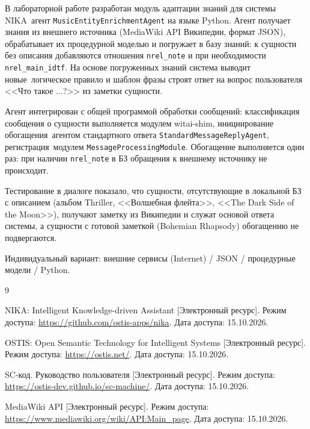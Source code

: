 
В лабораторной работе разработан модуль адаптации знаний для системы NIKA~\mdash  агент \texttt{MusicEntityEnrichmentAgent} на языке Python. Агент получает знания из внешнего источника (MediaWiki API Википедии, формат JSON), обрабатывает их процедурной моделью и погружает в базу знаний: к сущности без описания добавляются отношения \texttt{nrel\_note} и при необходимости \texttt{nrel\_main\_idtf}. На основе погруженных знаний система выводит новые~\mdash  логическое правило и шаблон фразы строят ответ на вопрос пользователя <<Что такое ...?>> из заметки сущности.

Агент интегрирован с общей программой обработки сообщений: классификация сообщения о сущности выполняется модулем witai-shim, инициирование обогащения~\mdash  агентом стандартного ответа \texttt{StandardMessageReplyAgent}, регистрация~\mdash  модулем \texttt{MessageProcessingModule}. Обогащение выполняется один раз: при наличии \texttt{nrel\_note} в БЗ обращения к внешнему источнику не происходит.

Тестирование в диалоге показало, что сущности, отсутствующие в локальной БЗ с описанием (альбом Thriller, <<Волшебная флейта>>, <<The Dark Side of the Moon>>), получают заметку из Википедии и служат основой ответа системы, а сущности с готовой заметкой (Bohemian Rhapsody) обогащению не подвергаются.

Индивидуальный вариант: внешние сервисы (Internet) / JSON / процедурные модели / Python.

\begin{thebibliography}{9}

	NIKA: Intelligent Knowledge-driven Assistant [Электронный ресурс]. \mdash  Режим доступа: \url{https://github.com/ostis-apps/nika}. \mdash  Дата доступа: 15.10.2026.

	OSTIS: Open Semantic Technology for Intelligent Systems [Электронный ресурс]. \mdash  Режим доступа: \url{https://ostis.net/}. \mdash  Дата доступа: 15.10.2026.

	SC-код. Руководство пользователя [Электронный ресурс]. \mdash  Режим доступа: \url{https://ostis-dev.github.io/sc-machine/}. \mdash  Дата доступа: 15.10.2026.

	MediaWiki API [Электронный ресурс]. \mdash  Режим доступа: \url{https://www.mediawiki.org/wiki/API:Main\_page}. \mdash  Дата доступа: 15.10.2026.
\end{thebibliography}
